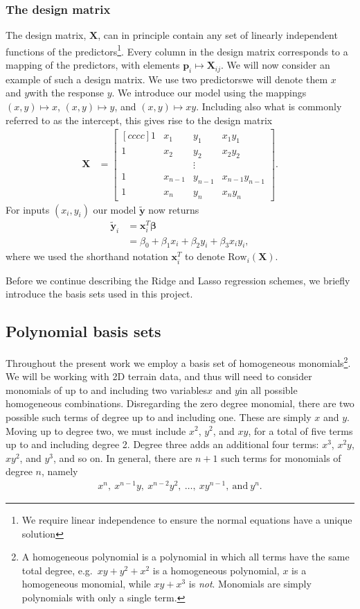 \documentclass[a4paper, twocolumn]{article}
\newcommand{\bmat}[2]{\begin{bmatrix}[#1] #2 \end{bmatrix}}  %
\begin{document}
\subsubsection{The design matrix}
The design matrix, $\mathbf{X}$, can in principle contain any set of linearly independent functions of the predictors\footnote{We require linear independence to ensure the normal equations have a unique solution}. Every column in the design matrix corresponds to a mapping of the predictors, with elements $\mathbf{p}_i\mapsto \mathbf{X}_{ij}$. We will now consider an example of such a design matrix. We use two predictors\textemdash we will denote them $x$ and $y$\textemdash with the response $y$. We introduce our model using the mappings $(x,y)\mapsto x$, $(x,y)\mapsto y$, and $(x,y)\mapsto xy$. Including also what is commonly referred to as the intercept, this gives rise to the design matrix 
\begin{align}
\mathbf{X} &= \bmat{cccc}{
  1 & x_1 & y_1 & x_1y_1 \\
  1 & x_2 & y_2 & x_2y_2 \\
    &     & \vdots       \\
  1 & x_{n-1} & y_{n-1} & x_{n-1}y_{n-1} \\
  1 & x_n & y_n & x_ny_n}.
\end{align}
For inputs $(x_i,y_i)$ our model $\tilde{\mathbf{y}}$ now returns 
\begin{align}
\tilde{\mathbf{y}}_i &= \mathbf{x}^T_i\bm\beta \nonumber \\
&= \beta_0 + \beta_1 x_i + \beta_2 y_i + \beta_3 x_iy_i,
\end{align}
where we used the shorthand notation $\mathbf{x}^T_i$ to denote $\text{Row}_i(\mathbf{X})$.


Before we continue describing the Ridge and Lasso regression schemes, we briefly introduce the basis sets used in this project.
\subsection{Polynomial basis sets}
Throughout the present work we employ a basis set of homogeneous monomials\footnote{A homogeneous polynomial is a polynomial in which all terms have the same total degree, e.g.\ $xy+y^2+x^2$ is a homogeneous polynomial, $x$ is a homogeneous monomial, while $xy+x^3$ is \textit{not}. Monomials are simply polynomials with only a single term.}. We will be working with 2D terrain data, and thus will need to consider monomials of up to and including two variables\textemdash $x$ and $y$\textemdash in all possible homogeneous combinations. Disregarding the zero degree monomial, there are two possible such terms of degree up to and including one. These are simply $x$ and $y$. Moving up to degree two, we must include $x^2$, $y^2$, and $xy$, for a total of five terms up to and including degree 2. Degree three adds an additional four terms: $x^3$, $x^2y$, $xy^2$, and $y^3$, and so on. In general, there are $n+1$ such terms for monomials of degree $n$, namely 
\begin{align}
x^n,\ x^{n-1}y, \ x^{n-2}y^2, \ \dots, \ xy^{n-1}, \ \text{and} \ y^n. \nonumber
\end{align}
\end{document}
